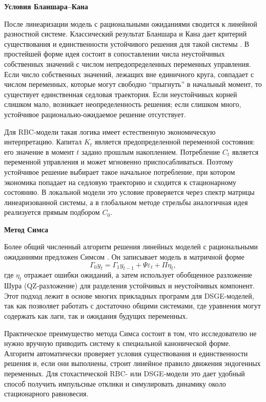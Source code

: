\medskip
\noindent\textbf{Условия Бланшара--Кана}
\par\smallskip

После линеаризации модель с рациональными ожиданиями сводится к линейной
разностной системе. Классический результат Бланшара и Кана дает критерий
существования и единственности устойчивого решения для такой системы
\cite{blanchardkahn1980}. В простейшей форме идея состоит в сопоставлении числа
неустойчивых собственных значений с числом непредопределенных переменных
управления. Если число собственных значений, лежащих вне единичного круга,
совпадает с числом переменных, которые могут свободно ``прыгнуть'' в начальный
момент, то существует единственная седловая траектория. Если неустойчивых
корней слишком мало, возникает неопределенность решения; если слишком много,
устойчивое рационально-ожидаемое решение отсутствует.

Для RBC-модели такая логика имеет естественную экономическую интерпретацию.
Капитал $K_t$ является предопределенной переменной состояния: его значение в
момент $t$ задано прошлым накоплением. Потребление $C_t$ является переменной
управления и может мгновенно приспосабливаться. Поэтому устойчивое решение
выбирает такое начальное потребление, при котором экономика попадает на
седловую траекторию и сходится к стационарному состоянию. В локальной модели
это условие проверяется через спектр матрицы линеаризованной системы, а в
глобальном методе стрельбы аналогичная идея реализуется прямым подбором $C_0$.

\medskip
\noindent\textbf{Метод Симса}
\par\smallskip

Более общий численный алгоритм решения линейных моделей с рациональными
ожиданиями предложен Симсом \cite{sims2002solving}. Он записывает модель в
матричной форме
\[
    \Gamma_0 y_t
    =
    \Gamma_1 y_{t-1}
    +
    \Psi \varepsilon_t
    +
    \Pi \eta_t,
\]
где $\eta_t$ отражает ошибки ожиданий, а затем использует обобщенное разложение
Шура (QZ-разложение) для разделения устойчивых и неустойчивых компонент. Этот
подход лежит в основе многих прикладных программ для DSGE-моделей, так как
позволяет работать с достаточно общими системами, где уравнения могут содержать
как лаги, так и ожидания будущих переменных.

Практическое преимущество метода Симса состоит в том, что исследователю не
нужно вручную приводить систему к специальной канонической форме. Алгоритм
автоматически проверяет условия существования и единственности решения и, если
они выполнены, строит линейное правило движения эндогенных переменных. Для
стохастической RBC- или DSGE-модели это дает удобный способ получить
импульсные отклики и симулировать динамику около стационарного равновесия.

